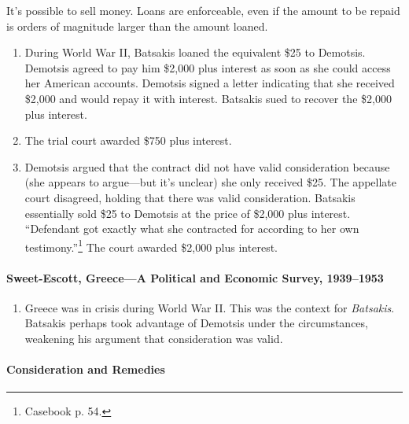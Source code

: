 It's possible to sell money. Loans are enforceable, even if the amount to be 
repaid is orders of magnitude larger than the amount loaned.

\begin{enumerate}
    \item During World War II, Batsakis loaned the equivalent \$25 to 
    Demotsis. Demotsis agreed to pay him \$2,000 plus interest as soon as she 
    could access her American accounts. Demotsis signed a letter indicating 
    that she received \$2,000 and would repay it with interest. Batsakis sued 
    to recover the \$2,000 plus interest.
    \item The trial court awarded \$750 plus interest.
    \item Demotsis argued that the contract did not have valid consideration 
    because (she appears to argue---but it's unclear) she only received \$25. 
    The appellate court disagreed, holding that there was valid consideration. 
    Batsakis essentially sold \$25 to Demotsis at the price of \$2,000 plus 
    interest. ``Defendant got exactly what she contracted for according to her 
    own testimony.''\footnote{Casebook p. 54.} The court awarded \$2,000 plus 
    interest.
\end{enumerate}

\paragraph{Sweet-Escott, Greece---A Political and Economic Survey, 
1939--1953}

\begin{enumerate}
    \item Greece was in crisis during World War II. This was the context for 
    \emph{Batsakis}. Batsakis perhaps took advantage of Demotsis under the 
    circumstances, weakening his argument that consideration was valid.
\end{enumerate}

\paragraph{Consideration and Remedies}

